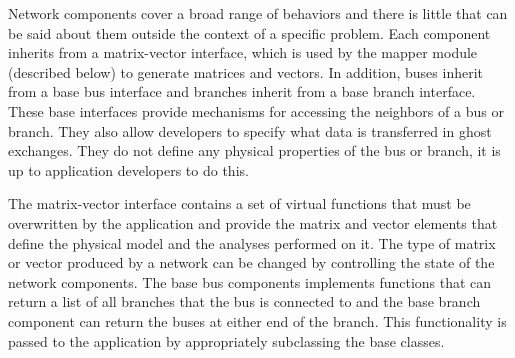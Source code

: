 \documentclass{acm_proc_article-sp}
\begin{document}
Network components cover a broad range of behaviors and there is little that can be
said about them outside the context of a specific problem. Each component inherits from a
matrix-vector interface, which is used by the mapper module (described below) to
generate matrices and vectors. In addition, buses inherit from a base bus
interface and branches inherit from a base branch interface. These base interfaces provide
mechanisms for accessing the neighbors of a bus or branch. They also allow
developers to specify
what data is transferred in ghost exchanges. They do not define any physical
properties of
the bus or branch, it is up to application developers to do this.

The matrix-vector interface contains a set of virtual functions that must be
overwritten by the application and provide the matrix and vector elements that
define the physical model and the analyses performed on it. The type of matrix
or vector produced by a network can be changed by controlling the state of the
network components. The base bus components implements functions that can return
a list of all branches that the bus is connected to and the base branch
component can return the buses at either end of the branch. This functionality
is passed to the application by appropriately subclassing the base classes.
\end{document}
